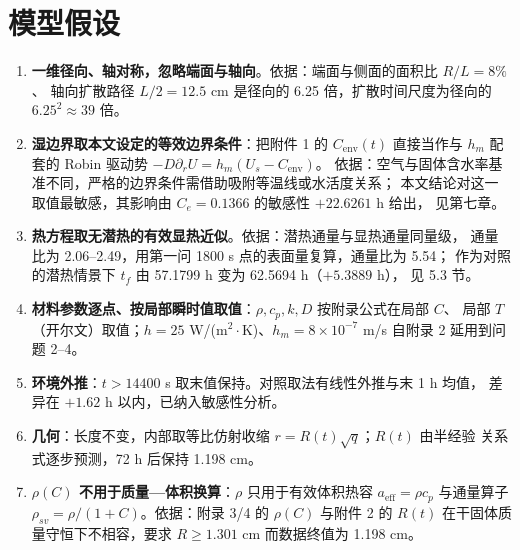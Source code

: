 \documentclass[12pt,a4paper]{ctexart}
\numberwithin{equation}{section}
\begin{document}
\section{模型假设}
\begin{enumerate}
  \item \textbf{一维径向、轴对称，忽略端面与轴向}。依据：端面与侧面的面积比 $R/L=8\%$、
        轴向扩散路径 $L/2=12.5$ cm 是径向的 6.25 倍，扩散时间尺度为径向的
        $6.25^2\approx39$ 倍。
  \item \textbf{湿边界取本文设定的等效边界条件}：把附件 1 的 $C_{\mathrm{env}}(t)$
        直接当作与 $h_m$ 配套的 Robin 驱动势 $-D\partial_rU=h_m(U_s-C_{\mathrm{env}})$。
        依据：空气与固体含水率基准不同，严格的边界条件需借助吸附等温线或水活度关系；
        本文结论对这一取值最敏感，其影响由 $C_e=0.1366$ 的敏感性 $+22.6261$ h 给出，
        见第七章。
  \item \textbf{热方程取无潜热的有效显热近似}。依据：潜热通量与显热通量同量级，
        通量比为 2.06--2.49，用第一问 1800 s 点的表面量复算，通量比为 5.54；
        作为对照的潜热情景下 $t_f$ 由 57.1799 h 变为 62.5694 h（$+5.3889$ h），
        见 5.3 节。
  \item \textbf{材料参数逐点、按局部瞬时值取值}：$\rho,c_p,k,D$ 按附录公式在局部 $C$、
        局部 $T$（开尔文）取值；$h=25$ W/(m$^2\cdot$K)、$h_m=8\times10^{-7}$ m/s
        自附录 2 延用到问题 2--4。
  \item \textbf{环境外推}：$t>14400$ s 取末值保持。对照取法有线性外推与末 1 h 均值，
        差异在 $+1.62$ h 以内，已纳入敏感性分析。
  \item \textbf{几何}：长度不变，内部取等比仿射收缩 $r=R(t)\sqrt q$；$R(t)$ 由半经验
        关系式逐步预测，72 h 后保持 1.198 cm。
  \item \textbf{$\rho(C)$ 不用于质量—体积换算}：$\rho$ 只用于有效体积热容
        $a_{\mathrm{eff}}=\rho c_p$ 与通量算子 $\rho_{sv}=\rho/(1+C)$。依据：附录 3/4 的
        $\rho(C)$ 与附件 2 的 $R(t)$ 在干固体质量守恒下不相容，要求 $R\ge1.301$ cm
        而数据终值为 1.198 cm。
\end{enumerate}
\end{document}
